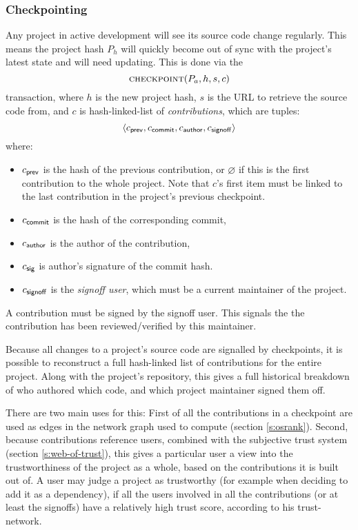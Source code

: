\subsubsection{Checkpointing} Any project in active development will see its
source code change regularly. This means the project hash $P_h$ will quickly
become out of sync with the project's latest state and will need updating. This
is done via the
\[
    \text{\normalfont\scshape checkpoint}\small{\lparen P_a, h, s, c\rparen}
\]
transaction, where $h$ is the new project hash, $s$ is the URL to
retrieve the source code from, and $c$ is hash-linked-list of
\emph{contributions}, which are tuples:
\[
   \langle c_{\mathsf{prev}}, c_{\mathsf{commit}}, c_{\mathsf{author}}, c_{\mathsf{signoff}}\rangle
\]
where:
\begin{itemize}
\item $c_{\mathsf{prev}}$ is the hash of the previous contribution, or
  $\varnothing$ if this is the first contribution to the whole
  project. Note that $c$'s first item must be linked to the last
  contribution in the project's previous checkpoint.
\item $c_{\mathsf{commit}}$ is the hash of the corresponding commit,
\item $c_{\mathsf{author}}$ is the author of the contribution,
\item $c_{\mathsf{sig}}$ is author's signature of the commit hash. 
\item $c_{\mathsf{signoff}}$ is the \emph{signoff user}, which must be a
  current maintainer of the project.
\end{itemize}
A contribution must be signed by the signoff user. This signals the
the contribution has been reviewed/verified by this maintainer.

Because all changes to a project's source code are signalled by
checkpoints, it is possible to reconstruct a full hash-linked list of
contributions for the entire project. Along with the project's
repository, this gives a full historical breakdown of who authored
which code, and which project maintainer signed them off.

There are two main uses for this: First of all the contributions in a
checkpoint are used as edges in the network graph used to compute
\osrank{} (section \ref{s:osrank}).  Second, because contributions
reference users, combined with the subjective trust system (section
\ref{s:web-of-trust}), this gives a particular user a view into the
trustworthiness of the project as a whole, based on the contributions
it is built out of. A user may judge a project as trustworthy (for
example when deciding to add it as a dependency), if all the users
involved in all the contributions (or at least the signoffs) have a
relatively high trust score, according to his trust-network.

